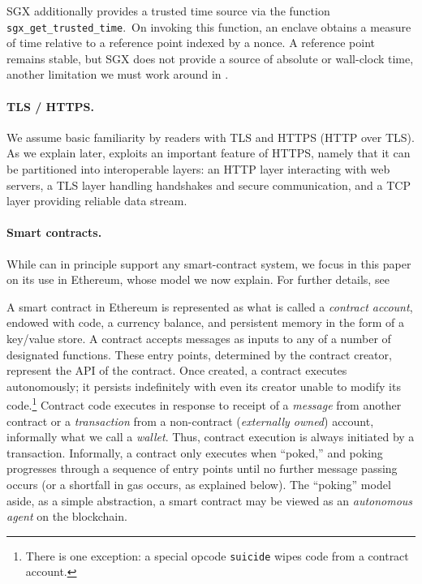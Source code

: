 SGX additionally provides a trusted time source via the function \texttt{sgx\_get\_trusted\_time}.~On invoking this function, an enclave obtains a measure of time relative to a reference point indexed by a nonce. A reference point remains stable, but SGX does not provide a source of absolute or wall-clock time, another limitation we must work around in \tc.

\paragraph{\bf TLS / HTTPS.}
We assume basic familiarity by readers with TLS and HTTPS (HTTP over TLS). As we explain later, \tc exploits an important feature of HTTPS, namely that it can be partitioned into interoperable layers: an HTTP layer interacting with web servers, a TLS layer handling handshakes and secure communication, and a TCP layer providing reliable data stream. 

\paragraph{\bf Smart contracts.}
\label{sec:contracts-and-gas}
While \tc can in principle support any smart-contract system, we focus in this paper on its use in Ethereum, whose model we now explain. For further details, see~\cite{whitepaper,yellowpaper}

A smart contract in Ethereum is represented as what is called a \emph{contract account}, endowed with code, a currency balance, and persistent memory in the form of a key/value store. A contract accepts messages as inputs to any of a number of designated functions. These entry points, determined by the contract creator, represent the API of the contract. Once created, a contract executes autonomously; it persists indefinitely with even its creator unable to modify its code.\footnote{There is one exception: a special opcode \texttt{suicide} wipes code from a contract account.} Contract code executes in response to receipt of a \emph{message} from another contract or a \emph{transaction} from a non-contract (\emph{externally owned}) account, informally what we call a \emph{wallet}. Thus, contract execution is always initiated by a transaction. Informally, a contract only executes when ``poked,'' and poking progresses through a sequence of entry points until no further message passing occurs (or a shortfall in gas occurs, as explained below). The ``poking'' model aside, as a simple abstraction, a smart contract may be viewed as an {\em autonomous agent} on the blockchain.

